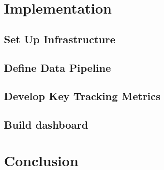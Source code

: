 \documentclass[12pt, a4paper]{article}
\begin{document}
\section{Implementation}
    \subsection{Set Up Infrastructure}
    \subsection{Define Data Pipeline}
    \subsection{Develop Key Tracking Metrics}
    \subsection{Build dashboard}
\section{Conclusion}




\nocite{*}
\end{document}
